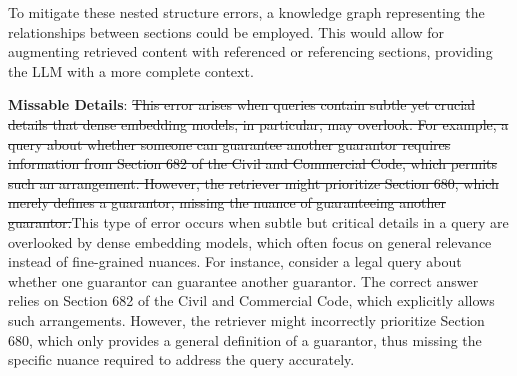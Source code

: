 
To mitigate these nested structure errors, a knowledge graph representing the relationships between sections could be employed. This would allow for augmenting retrieved content with referenced or referencing sections, providing the LLM with a more complete context.


\textbf{Missable Details}: \st{This error arises when queries contain subtle yet crucial details that dense embedding models, in particular, may overlook. For example, a query about whether someone can guarantee another guarantor requires information from Section 682 of the Civil and Commercial Code, which permits such an arrangement. However, the retriever might prioritize Section 680, which merely defines a guarantor, missing the nuance of guaranteeing another guarantor.}\textcolor{prange}{This type of error occurs when subtle but critical details in a query are overlooked by dense embedding models, which often focus on general relevance instead of fine-grained nuances. For instance, consider a legal query about whether one guarantor can guarantee another guarantor. The correct answer relies on Section 682 of the Civil and Commercial Code, which explicitly allows such arrangements. However, the retriever might incorrectly prioritize Section 680, which only provides a general definition of a guarantor, thus missing the specific nuance required to address the query accurately.}

